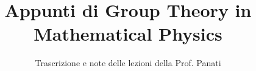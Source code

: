 \documentclass[a4paper,12pt]{article}
\title{Appunti di Group Theory in Mathematical Physics}
\author{Trascrizione e note delle lezioni della Prof. Panati}
\date{}
\begin{document}
\maketitle
\projectintro
\tableofcontents
\newpage

\end{document}

